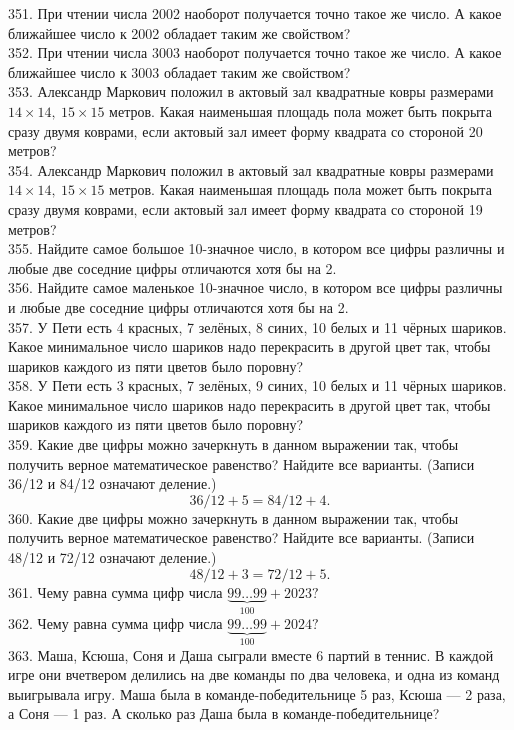351. При чтении числа 2002 наоборот получается точно такое же число. А какое ближайшее число к 2002 обладает таким же свойством?\\
352. При чтении числа 3003 наоборот получается точно такое же число. А какое ближайшее число
к 3003 обладает таким же свойством?\\
353. Александр Маркович положил в актовый зал квадратные ковры размерами $14 \times 14,\ 15 \times 15$ метров. Какая наименьшая площадь пола может быть покрыта сразу двумя коврами, если актовый зал имеет форму квадрата со стороной 20 метров?\\
354. Александр Маркович положил в актовый зал квадратные ковры размерами $14 \times 14,\ 15 \times 15$ метров. Какая наименьшая площадь пола может быть покрыта сразу двумя коврами, если актовый зал имеет форму квадрата со стороной 19 метров?\\
355. Найдите самое большое 10-значное число, в котором все цифры различны и любые две соседние цифры отличаются хотя бы на 2.\\
356. Найдите самое маленькое 10-значное число, в котором все цифры различны и любые две соседние цифры отличаются хотя бы на 2.\\
357. У Пети есть 4 красных, 7 зелёных, 8 синих, 10 белых и 11 чёрных шариков. Какое минимальное число шариков надо перекрасить в другой цвет так, чтобы шариков каждого из пяти цветов было поровну?\\
358. У Пети есть 3 красных, 7 зелёных, 9 синих, 10 белых и 11 чёрных шариков. Какое минимальное число шариков надо перекрасить в другой цвет так, чтобы шариков каждого из пяти цветов было поровну?\\
359. Какие две цифры можно зачеркнуть в данном выражении так, чтобы получить верное математическое равенство? Найдите все варианты. (Записи 36/12 и 84/12 означают деление.)
$$ 36/12+5=84/12+4.$$
360. Какие две цифры можно зачеркнуть в данном выражении так, чтобы получить верное математическое равенство? Найдите все варианты. (Записи 48/12 и 72/12 означают деление.)
$$48/12+3=72/12+5.$$
361. Чему равна сумма цифр числа $\underbrace{99\ldots99}_{100}+2023?$\\
362. Чему равна сумма цифр числа $\underbrace{99\ldots99}_{100}+2024?$\\
363. Маша, Ксюша, Соня и Даша сыграли вместе 6 партий в теннис. В каждой игре они вчетвером делились на две команды по два человека, и одна из команд выигрывала игру. Маша была в команде-победительнице 5 раз, Ксюша --- 2 раза, а Соня --- 1 раз. А сколько раз Даша была в команде-победительнице?\\
